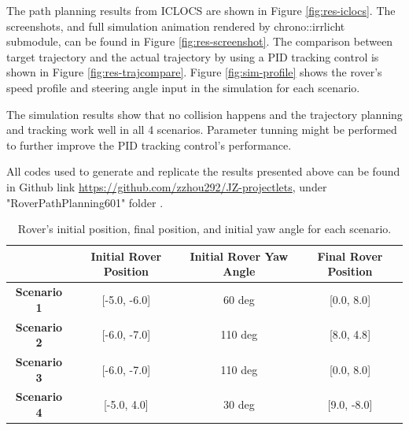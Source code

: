 \documentclass{article}
\begin{document}
The path planning results from ICLOCS are shown in Figure \ref{fig:res-iclocs}. The screenshots, and full simulation animation rendered by chrono::irrlicht submodule, can be found in Figure \ref{fig:res-screenshot}. The comparison between target trajectory and the actual trajectory by using a PID tracking control is shown in Figure \ref{fig:res-trajcompare}. Figure \ref{fig:sim-profile} shows the rover's speed profile and steering angle input in the simulation for each scenario. 

The simulation results show that no collision happens and the trajectory planning and tracking work well in all 4 scenarios. Parameter tunning might be performed to further improve the PID tracking control's performance. 

All codes used to generate and replicate the results presented above can be found in Github link \url{https://github.com/zzhou292/JZ-projectlets}, under "RoverPathPlanning601" folder \cite{Github}. 

\begin{table}[]
	\centering
	\begin{tabular}{|c|c|c|c|}
		\hline
		& \textbf{Initial Rover Position} & \textbf{Initial Rover Yaw Angle} & \textbf{Final Rover Position} \\ \hline
		\textbf{Scenario 1} & {[}-5.0, -6.0{]}                & 60 deg                           & {[}0.0, 8.0{]}                \\ \hline
		\textbf{Scenario 2} & {[}-6.0, -7.0{]}                & 110 deg                          & {[}8.0, 4.8{]}                \\ \hline
		\textbf{Scenario 3} & {[}-6.0, -7.0{]}                & 110 deg                          & {[}0.0, 8.0{]}                \\ \hline
		\textbf{Scenario 4} & {[}-5.0, 4.0{]}                 & 30 deg                           & {[}9.0, -8.0{]}               \\ \hline
	\end{tabular}
	\caption{Rover's initial position, final position, and initial yaw angle for each scenario.}
	\label{tab:sce_setup}
\end{table}
\end{document}
